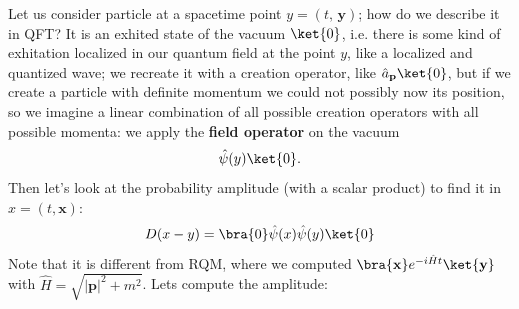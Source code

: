 Let us consider  particle at a spacetime point \(y = (t,\,\mathbf{y})\); how do we describe it in QFT? It is an exhited state of the vacuum \(\ket{0}\), i.e. there is some kind of exhitation localized in our quantum field at the point \(y\), like a localized and quantized wave; we recreate it with a creation operator, like \(\hat a_{\mathbf{p}} \ket{0}\), but if we create a particle with definite momentum we could not possibly now its position, so we imagine a linear combination of all possible creation operators with all possible momenta: we apply the \textbf{field operator} on the vacuum
\[
    \hat \psi(y) \ket{0}.
\]
Then let's look at the probability amplitude (with a scalar product) to find it in \(x = (t,\mathbf{x})\):
\[
    D(x-y) = \bra{0} \hat \psi (x) \hat \psi (y) \ket{0}
\]
Note that it is different from RQM, where we computed \(\bra{\mathbf{x}} e^{-i \hat H t} \ket{\mathbf{y}}\) with \(\hat H = \sqrt{\vert \mathbf{p} \vert^2 + m^2}\). Lets compute the amplitude:

